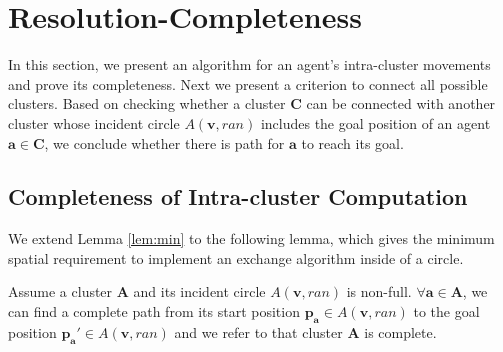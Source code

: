 \section{Resolution-Completeness}

In this section, we present an algorithm for an agent's intra-cluster movements and prove its completeness. Next we present a criterion to connect all possible clusters.
Based on checking whether a cluster $\mathbf{C}$ can be connected with another cluster whose incident circle $A(\mathbf v,ran)$ includes the goal position of an agent $\mathbf{a} \in \mathbf{C}$, we conclude whether there is path for $\mathbf{a}$ to reach its goal. 
 
 
\subsection{Completeness of Intra-cluster Computation}


We extend Lemma \ref{lem:min} to the following lemma, which gives the minimum spatial requirement to implement an exchange algorithm inside of a circle.

\vspace*{.05in}
\begin{lemma}
Assume a cluster $\mathbf{A}$ and its incident circle $A(\mathbf v,ran)$ is non-full. $\forall \mathbf{a} \in \mathbf{A}$, we can find a complete path from its start position $\mathbf{p_a} \in A(\mathbf v,ran)$ to the goal position $\mathbf{p_a'} \in A(\mathbf v,ran)$ and we refer to that cluster $\mathbf{A}$ is complete. 
\label{lem:intra-unit complete}
\end{lemma}


